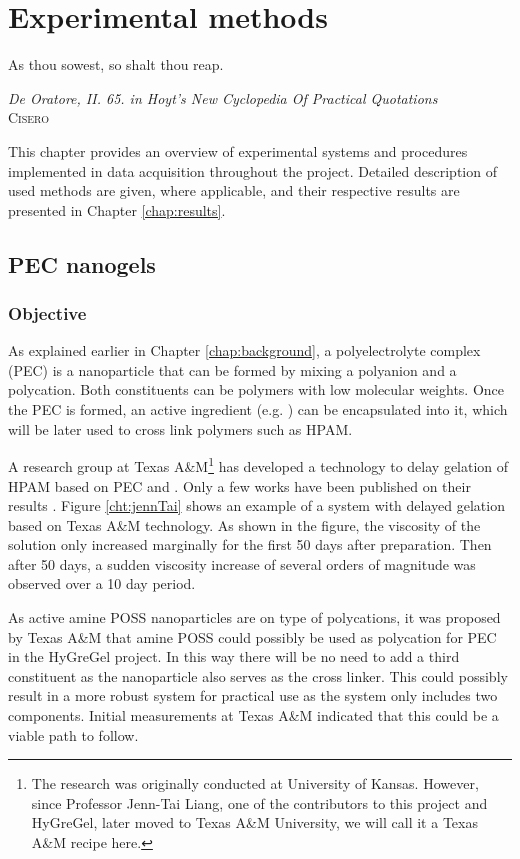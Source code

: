 \chapter{Experimental methods} \label{chap:experimental}
\vspace*{\fill}
\epigraph{As thou sowest, so shalt thou reap.}%
{\textit{De Oratore, II. 65. in Hoyt's New Cyclopedia Of Practical Quotations}\\ \textsc{Cisero}}
\clearpage{\thispagestyle{empty}\cleardoublepage}
This chapter provides an overview of experimental systems and procedures implemented in data acquisition throughout the project. Detailed description of used methods are given, where applicable, and their respective results are presented in Chapter \ref{chap:results}.

\section{PEC nanogels} 
\subsection{Objective}
As explained earlier in Chapter \ref{chap:background}, a polyelectrolyte complex (PEC) is a nanoparticle that can be formed by mixing a polyanion and a polycation. Both constituents can be polymers with low molecular weights. Once the PEC is formed, an active ingredient (e.g. ) can be encapsulated into it, which will be later used to cross link polymers such as HPAM.

A research group at Texas A\&M\footnote{The research was originally conducted at University of Kansas. However, since Professor Jenn-Tai Liang, one of the contributors to this project and HyGreGel, later moved to Texas A\&M University, we will call it a Texas A\&M recipe here.} has developed a technology to delay gelation of HPAM based on PEC and . Only a few works have been published on their results \citep[e.g.][]{Cordova2008,Johnson2010}. Figure \ref{cht:jennTai} shows an example of a system with delayed gelation based on Texas A\&M technology. As shown in the figure, the viscosity of the solution only increased marginally for the first 50 days after preparation. Then after 50 days, a sudden viscosity increase of several orders of magnitude was observed over a 10 day period.

As active amine POSS nanoparticles are on type of polycations, it was proposed by Texas A\&M that amine POSS could possibly be used as polycation for PEC in the HyGreGel project. In this way there will be no need to add a third constituent as the nanoparticle also serves as the cross linker. This could possibly result in a more robust system for practical use as the system only includes two components. Initial measurements at Texas A\&M indicated that this could be a viable path to follow.

